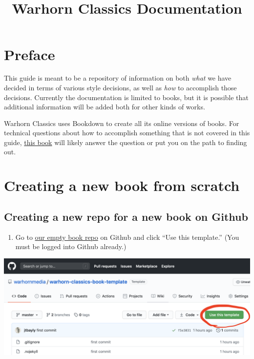\documentclass[
]{book}
\title{Warhorn Classics Documentation}
\author{}
\date{\vspace{-2.5em}}
\providecommand{\tightlist}{%
  \setlength{\itemsep}{0pt}\setlength{\parskip}{0pt}}
\begin{document}
\maketitle

\mainmatter
{}

{
\setcounter{tocdepth}{1}
\tableofcontents
}
\hypertarget{preface}{%
\chapter*{Preface}\label{preface}}

This guide is meant to be a repository of information on both \emph{what} we have decided in terms of various style decisions, as well as \emph{how} to accomplish those decisions. Currently the documentation is limited to books, but it is possible that additional information will be added both for other kinds of works.

Warhorn Classics uses Bookdown to create all its online versions of books. For technical questions about how to accomplish something that is not covered in this guide, \href{https://bookdown.org/yihui/bookdown/}{this book} will likely answer the question or put you on the path to finding out.

\hypertarget{creating-a-new-book-from-scratch}{%
\chapter{Creating a new book from scratch}\label{creating-a-new-book-from-scratch}}

\hypertarget{creating-a-new-repo-for-a-new-book-on-github}{%
\section{Creating a new repo for a new book on Github}\label{creating-a-new-repo-for-a-new-book-on-github}}

\begin{enumerate}
\def\labelenumi{\arabic{enumi}.}
\tightlist
\item
  Go to \href{https://github.com/warhornmedia/classics-empty-book}{our empty book repo} on Github and click ``Use this template.'' (You must be logged into Github already.)
\end{enumerate}

\begin{center}\includegraphics[width=0.65\linewidth]{images/screenshot1} \end{center}
\end{document}
